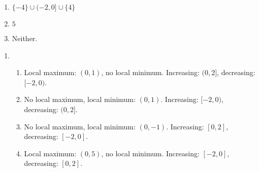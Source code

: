 \begin{multicols}{3}
\begin{enumerate}
\setcounter{enumi}{\value{HW}}

\item $\{-4\} \cup (-2,0] \cup \{4\}$
\item  $5$
\item Neither.

\setcounter{HW}{\value{enumi}}
\end{enumerate}
\end{multicols}

\begin{enumerate}
\setcounter{enumi}{\value{HW}}
\addtocounter{enumi}{4}
\item \begin{enumerate}
\item Local maximum: $(0,1)$, no local minimum.  Increasing: $(0,2]$, decreasing: $[-2,0)$.
\item No local maximum,  local minimum: $(0,1)$.  Increasing: $[-2,0)$, decreasing: $(0,2]$.
\item No local maximum,  local minimum: $(0,-1)$.  Increasing: $[0,2]$, decreasing: $[-2,0]$.
\item Local maximum: $(0,5)$, no local minimum.  Increasing: $[-2,0]$, decreasing: $[0,2]$.
\end{enumerate}

\setcounter{HW}{\value{enumi}}
\end{enumerate}



